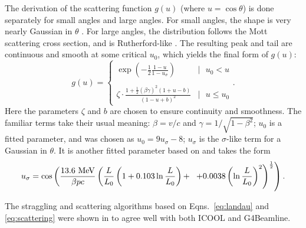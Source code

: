\documentclass[a4paper,11pt]{article}
\begin{document}
The derivation of the scattering function $g(u)$ (where  $u = \cos\theta$) is done separately for small angles and large angles. For small angles, the shape is very nearly Gaussian in $\theta$ \cite{GS}. For large angles, the distribution follows the Mott scattering cross section, and is Rutherford-like \cite{Mott}. The resulting peak and tail are continuous and smooth at some critical $u_0$, which yields the final form of $g(u)$:
\begin{equation}
  g(u) = \left\{
  \begin{array}{lr}
    \displaystyle{\exp\left(-\frac{1}{2}\frac{1-u}{1-u_\sigma}\right)} & |\text{ } u_0 < u\\
    \displaystyle{} \\
    \displaystyle{\zeta\cdot\frac{1+\frac{1}{2}(\beta\gamma)^2(1+u-b)}{(1-u+b)^2}} & | \text{ } u \le u_0
  \end{array}.
\right.
\label{eq:scattering}
\end{equation}
Here the parameters $\zeta$ and $b$ are chosen to ensure continuity and smoothness. The familiar terms take their usual meaning: $\beta=v/c$ and $\gamma=1/\sqrt{1-\beta^2}$; $u_0$ is a fitted parameter, and was chosen as $u_0=9u_\sigma-8$; $u_\sigma$ is the $\sigma$-like term for a Gaussian in $\theta$. It is another fitted parameter based on \cite{highland} and takes the form
\[
u_\sigma=\cos\left(\frac{13.6 \text{ MeV}}{\beta pc}\left(\frac{L}{L_0}\left(1+0.103\ln\frac{L}{L_0}\right)+\right.\right.\\
\left.\left.+0.0038\left(\ln\frac{L}{L_0}\right)^2\right)^\frac{1}{2}\right).
\]

The straggling and scattering algorithms based on Eqns.~\ref{eq:landau} and \ref{eq:scattering} were shown in \cite{icap15} to agree well with both ICOOL and G4Beamline.


\iffalse
\end{document}
